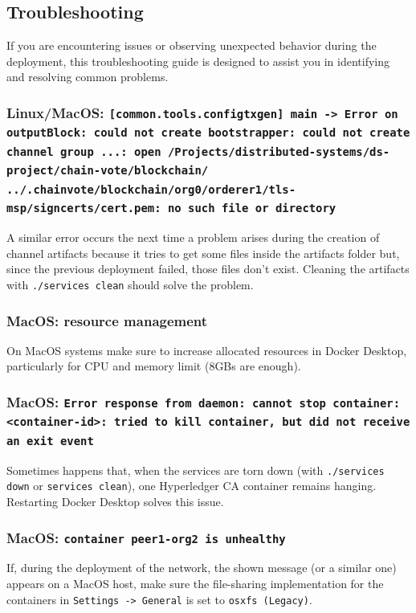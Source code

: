 \documentclass{scrartcl}
\begin{document}
\subsection{Troubleshooting}
If you are encountering issues or observing unexpected behavior during the deployment, this troubleshooting guide is designed to assist you in identifying and resolving common problems.

\subsubsection*{Linux/MacOS: \texttt{[common.tools.configtxgen] main -> Error on outputBlock: could not create bootstrapper: could not create channel group ...: open /Projects/distributed-systems/ds-project/chain-vote/blockchain/ \\../.chainvote/blockchain/org0/orderer1/tls-msp/signcerts/cert.pem: no such file or directory}}

A similar error occurs the next time a problem arises during the creation of channel artifacts because it tries to get some files inside the artifacts folder but, since the previous deployment failed, those files don't exist.
%
Cleaning the artifacts with \texttt{./services clean} should solve the problem.

\subsubsection*{MacOS: resource management}
On MacOS systems make sure to increase allocated resources in Docker Desktop, particularly for CPU and memory limit (8GBs are enough).

\subsubsection*{MacOS: \texttt{Error response from daemon: cannot stop container: <container-id>: tried to kill container, but did not receive an exit event}}

Sometimes happens that, when the services are torn down (with \texttt{./services down} or \texttt{services clean}), one Hyperledger CA container remains hanging.
Restarting Docker Desktop solves this issue.

\subsubsection*{MacOS: \texttt{container peer1-org2 is unhealthy}}
If, during the deployment of the network, the shown message (or a similar one) appears on a MacOS host, make sure the file-sharing implementation for the containers in \texttt{Settings -> General} is set to \texttt{osxfs (Legacy)}.
\end{document}
